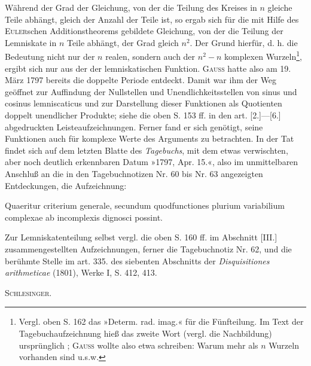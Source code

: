 \medskip\begingroup\small
\indent Während der Grad der Gleichung, von der die Teilung des Kreises in \(n\) gleiche Teile abhängt, gleich der Anzahl der Teile ist, so ergab sich für die mit Hilfe des \textsc{Euler}schen Additionstheorems gebildete Gleichung, von der die Teilung der Lemniskate in \(n\) Teile abhängt, der Grad gleich \(n^2\). Der Grund hierfür, d. h. die Bedeutung nicht nur der \(n\) realen, sondern auch der \(n^2-n\) komplexen Wurzeln\begingroup\renewcommand{\thefootnote}{**)}\footnote{Vergl. oben S. 162 das »Determ. rad. imag.« für die Fünfteilung. Im Text der Tagebuchaufzeichnung hieß das zweite Wort (vergl. die Nachbildung) ursprünglich ; \textsc{Gauss} wollte also etwa schreiben: Warum mehr als \(n\) Wurzeln vorhanden sind u.s.w.}\endgroup, ergibt sich nur aus der  der lemniskatischen Funktion. \textsc{Gauss} hatte also am 19. März 1797 bereits die doppelte Periode entdeckt. Damit war ihm der Weg geöffnet zur Auffindung der Nullstellen und Unendlichkeitsstellen von sinus und cosinus lemniscaticus und zur Darstellung dieser Funktionen als Quotienten doppelt unendlicher Produkte; siehe die oben S. 153 ff. in den art. [2.]—[6.] abgedruckten Leisteaufzeichnungen. Ferner fand er sich genötigt, seine Funktionen auch für komplexe Werte des Arguments zu betrachten. In der Tat findet sich auf dem letzten Blatte des \textit{Tagebuchs}, mit dem etwas verwischten, aber noch deutlich erkennbaren Datum »1797, Apr. 15.«, also im unmittelbaren Anschluß an die in den Tagebuchnotizen Nr. 60 bis Nr. 63 angezeigten Entdeckungen, die Aufzeichnung:
\par\endgroup
\indent {} Quaeritur criterium generale, secundum quod\linebreak functiones plurium variabilium complexae ab incomplexis dignosci possint.

\begingroup\small
\indent Zur Lemniskatenteilung selbst vergl. die oben S. 160 ff. im Abschnitt [III.] zusammengestellten Aufzeichnungen, ferner die Tagebuchnotiz Nr. 62, und die berühmte Stelle im art. 335. des siebenten Abschnitts der \textit{Disquisitiones arithmeticae} (1801), Werke I, S. 412, 413.
\par\noindent\hfill\textsc{Schlesinger.}
\par\endgroup
